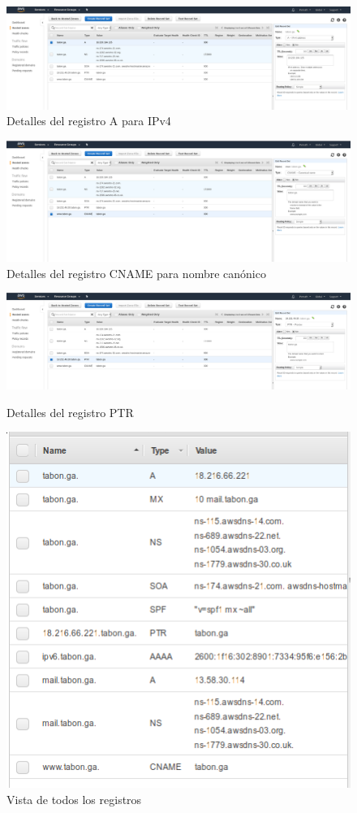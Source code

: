 \documentclass[12pt]{article}
\begin{document}
\begin{figure}[H]
  \centering
  \includegraphics[width=0.8\linewidth]{A}
  \caption{Detalles del registro A para IPv4}
\end{figure}
\begin{figure}[H]
  \centering
  \includegraphics[width=0.8\linewidth]{CNAME}
  \caption{Detalles del registro CNAME para nombre canónico}
\end{figure}
\begin{figure}[H]
  \centering
  \includegraphics[width=0.8\linewidth]{PTR}
  \caption{Detalles del registro PTR}
  \includegraphics[scale=0.5]{record_set}
  \caption{Vista de todos los registros}
\end{figure}
\end{document}
